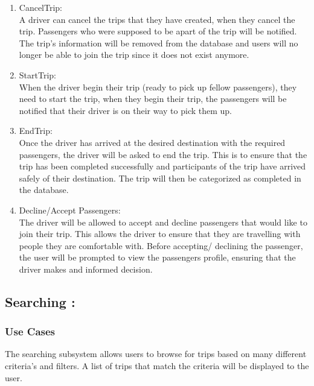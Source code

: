 \documentclass[hidelinks, 12pt, a4paper]{article}
\begin{document}
\begin{enumerate}[label=U1.\arabic*]
      \item CancelTrip:\\
            A driver can cancel the trips that they have created, when they cancel the trip. Passengers who were supposed to be apart of the trip will be notified. The trip’s information will be removed from the database and users will no longer be able to join the trip since it does not exist anymore.\\

      \item StartTrip: \\
            When the driver begin their trip (ready to pick up fellow passengers), they need to start the trip, when they begin their trip, the passengers will be notified that their driver is on their way to pick them up.\\

      \item EndTrip:\\
            Once the driver has arrived at the desired destination with the required passengers, the driver will be asked to end the trip. This is to ensure that the trip has been completed successfully and participants of the trip have arrived safely of their destination. The trip will then be categorized  as completed in the database.\\

      \item Decline/Accept Passengers:\\
            The driver will be allowed to accept and decline passengers that would like to join their trip. This allows the driver to ensure that they are travelling with people they are comfortable with. Before accepting/ declining the passenger, the user will be prompted to view the passengers profile, ensuring that the driver makes and informed decision.\\

\end{enumerate}

\newpage
\subsection{Searching :}
\subsubsection{Use Cases}
The searching subsystem allows users to browse for trips based on many different criteria’s and filters. A list of trips that match the criteria will be displayed to the user.
\end{document}
